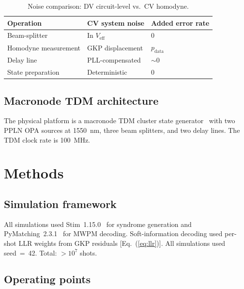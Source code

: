 \documentclass[twocolumn,showpacs,preprintnumbers,amsmath,amssymb,superscriptaddress]{revtex4-2}
\begin{document}
\begin{table}[b]
\caption{Noise comparison: DV circuit-level vs.\ CV homodyne.}
\label{tab:noise_comparison}
\begin{ruledtabular}
\begin{tabular}{lll}
Operation & CV system noise & Added error rate \\
\hline
Beam-splitter & In $V_{\mathrm{eff}}$ & 0 \\
Homodyne measurement & GKP displacement & $p_{\mathrm{data}}$ \\
Delay line & PLL-compensated & $\sim 0$ \\
State preparation & Deterministic & 0 \\
\end{tabular}
\end{ruledtabular}
\end{table}

\subsection{Macronode TDM architecture}

The physical platform is a macronode TDM cluster state generator~\cite{menicucci2014,walshe2019,asavanant2019} with two PPLN OPA sources at 1550~nm, three beam splitters, and two delay lines. The TDM clock rate is 100~MHz.

\section{Methods}
\label{sec:methods}

\subsection{Simulation framework}

All simulations used Stim~1.15.0~\cite{gidney2021} for syndrome generation and PyMatching~2.3.1~\cite{higgott2023} for MWPM decoding. Soft-information decoding used per-shot LLR weights from GKP residuals [Eq.~(\ref{eq:llr})]. All simulations used seed~=~42. Total: $>10^7$ shots.

\subsection{Operating points}
\end{document}
